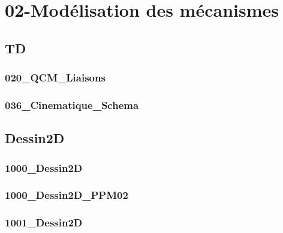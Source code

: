 \clearpage
\chapter{02-Modélisation des mécanismes}

\section{TD}

\subsection{020\_QCM\_Liaisons}
\graphicspath{{../02-Modélisation des mécanismes/TD/020_QCM_Liaisons/images/}{../02-Modélisation des mécanismes/TD/020_QCM_Liaisons/}{../Style/png/}}


\subsection{036\_Cinematique\_Schema}
\graphicspath{{../02-Modélisation des mécanismes/TD/036_Cinematique_Schema/images/}{../02-Modélisation des mécanismes/TD/036_Cinematique_Schema/}{../Style/png/}}


\section{Dessin2D}

\subsection{1000\_Dessin2D}
\graphicspath{{../02-Modélisation des mécanismes/TD/Dessin2D/1000_Dessin2D/images/}{../02-Modélisation des mécanismes/TD/Dessin2D/1000_Dessin2D/}{../Style/png/}}


\subsection{1000\_Dessin2D\_PPM02}
\graphicspath{{../02-Modélisation des mécanismes/TD/Dessin2D/1000_Dessin2D_PPM02/images/}{../02-Modélisation des mécanismes/TD/Dessin2D/1000_Dessin2D_PPM02/}{../Style/png/}}


\subsection{1001\_Dessin2D}
\graphicspath{{../02-Modélisation des mécanismes/TD/Dessin2D/1001_Dessin2D/images/}{../02-Modélisation des mécanismes/TD/Dessin2D/1001_Dessin2D/}{../Style/png/}}


